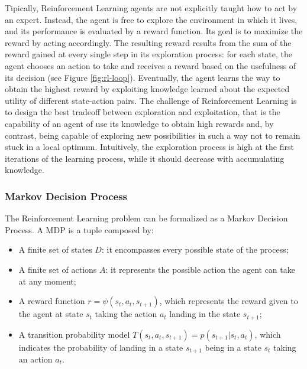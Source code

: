 Tipically, Reinforcement Learning agents are not explicitly taught how to act by an expert. Instead, the agent is free to explore the environment in which it lives, and its performance is evaluated by a reward function. Its goal is to maximize the reward by acting accordingly. The resulting reward results from the sum of the reward gained at every single step in its exploration process: for each state, the agent chooses an action to take and receives a reward based on the usefulness of its decision (see Figure \ref{fig:rl-loop}). Eventually, the agent learns the way to obtain the highest reward by exploiting knowledge learned about the expected utility of different state-action pairs. The challenge of Reinforcement Learning is to design the best tradeoff between exploration and exploitation, that is the capability of an agent of use its knowledge to obtain high rewards and, by contrast, being capable of exploring new possibilities in such a way not to remain stuck in a local optimum. Intuitively, the exploration process is high at the first iterations of the learning process, while it should decrease with accumulating knowledge.


\subsubsection{Markov Decision Process}
The Reinforcement Learning problem can be formalized as a Markov Decision Process. A MDP is a tuple composed by:
\begin{itemize}
  \item A finite set of states \(D\): it encompasses every possible state of the process;
  \item A finite set of actions \(A\): it represents the possible action the agent can take at any moment;
  	\item A reward function \(r = \psi(s_t,a_t,s_{t+1})\), which represents the reward given to the agent at state \(s_t\) taking the action \(a_t\) landing in the state \(s_{t+1};\)
  	\item A transition probability model \(T(s_t,a_t,s_{t+1}) = p(s_{t+1}|s_t,a_t)\), which indicates the probability of landing in a state \(s_{t+1}\) being in a state \(s_t\) taking an action \(a_t.\)
\end{itemize}

